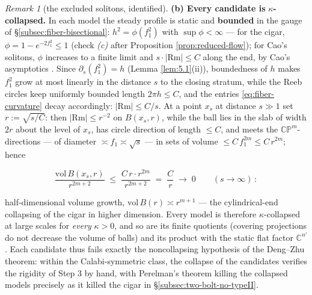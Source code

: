 \documentclass[11pt]{amsart}
\theoremstyle{plain}
\numberwithin{equation}{section}
\theoremstyle{definition}
\theoremstyle{remark}
\newtheorem*{remarkx}{Remark}
\begin{document}
\begin{remarkx}[the excluded solitons, identified]
	\textbf{(b) Every candidate is }$\kappa$\textbf{-collapsed.} In each model the steady profile is static and \textbf{bounded} in the gauge of \S\ref{subsec:fiber-bisectional}: $h^2 = \phi ( f_1^2 )$ with $\sup \phi < \infty$ --- for the cigar, $\phi = 1 - e^{- 2 f_1^2} \leq 1$ (check \emph{(c)} after Proposition \ref{prop:reduced-flow}); for Cao's solitons, $\phi$ increases to a finite limit and $s \cdot | \mathrm{Rm} | \leq C$ along the end, by Cao's asymptotics \cite{Cao96}. Since $\partial_s ( f_1^2 ) = h$ (Lemma \ref{lem:5.1}(ii)), boundedness of $h$ makes $f_1^2$ grow at most linearly in the distance $s$ to the closing stratum, while the Reeb circles keep uniformly bounded length $2 \pi h \leq C$, and the entries \eqref{eq:fiber-curvature} decay accordingly: $| \mathrm{Rm} | \leq C / s$. At a point $x_s$ at distance $s \gg 1$ set $r := \sqrt{s / C}$: then $| \mathrm{Rm} | \leq r^{- 2}$ on $B ( x_s, r )$, while the ball lies in the slab of width $2 r$ about the level of $x_s$, has circle direction of length $\leq C$, and meets the $\mathbb{CP}^m$-directions --- of diameter $\asymp f_1 \asymp \sqrt{s}$ --- in sets of volume $\leq C\, f_1^{2 m} \leq C\, r^{2 m}$; hence
	
	\[
	\frac{\mathrm{vol}\, B ( x_s, r )}{r^{2 m + 2}} \;\leq\; \frac{C\, r \cdot r^{2 m}}{r^{2 m + 2}} \;=\; \frac{C}{r} \;\longrightarrow\; 0 \qquad ( s \to \infty ) \,:
	\]
	
	half-dimensional volume growth, $\mathrm{vol}\, B ( r ) \asymp r^{m + 1}$ --- the cylindrical-end collapsing of the cigar in higher dimension. Every model is therefore $\kappa$-collapsed at large scales for \emph{every} $\kappa > 0$, and so are its finite quotients (covering projections do not decrease the volume of balls) and its product with the static flat factor $\mathbb{C}^{n'}$. Each candidate thus fails exactly the noncollapsing hypothesis of the Deng--Zhu theorem: within the Calabi-symmetric class, the collapse of the candidates verifies the rigidity of Step 3 by hand, with Perelman's theorem killing the collapsed models precisely as it killed the cigar in \S\ref{subsec:two-bolt-no-typeII}.
	
\end{remarkx}
\end{document}
